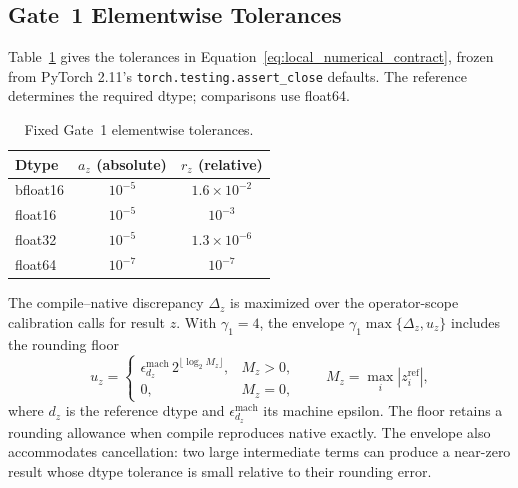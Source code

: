 \subsection{Gate~1 Elementwise Tolerances}
\label{app:gate1_tolerances}
Table~\ref{tab:gate1_tolerances} gives the tolerances in Equation~\ref{eq:local_numerical_contract}, frozen from PyTorch 2.11's \texttt{torch.testing.assert\_close} defaults. The reference determines the required dtype; comparisons use float64.

\begin{table}[h]
\centering
\caption{Fixed Gate~1 elementwise tolerances.}
\label{tab:gate1_tolerances}
\begin{tabular}{lcc}
\toprule
Dtype & $a_z$ (absolute) & $r_z$ (relative) \\
\midrule
bfloat16 & $10^{-5}$ & $1.6\times10^{-2}$ \\
float16  & $10^{-5}$ & $10^{-3}$ \\
float32  & $10^{-5}$ & $1.3\times10^{-6}$ \\
float64  & $10^{-7}$ & $10^{-7}$ \\
\bottomrule
\end{tabular}
\end{table}

The compile--native discrepancy $\Delta_z$ is maximized over the operator-scope calibration calls for result $z$. With $\gamma_1=4$, the envelope $\gamma_1\max\{\Delta_z,u_z\}$ includes the rounding floor
\begin{equation}
u_z=
\begin{cases}
\epsilon_{d_z}^{\mathrm{mach}}\,2^{\lfloor\log_2 M_z\rfloor}, & M_z>0,\\
0, & M_z=0,
\end{cases}
\qquad
M_z=\max_i|z_i^{\mathrm{ref}}|,
\label{eq:gate1_rounding_unit}
\end{equation}
where $d_z$ is the reference dtype and $\epsilon_{d_z}^{\mathrm{mach}}$ its machine epsilon. The floor retains a rounding allowance when compile reproduces native exactly. The envelope also accommodates cancellation: two large intermediate terms can produce a near-zero result whose dtype tolerance is small relative to their rounding error.

